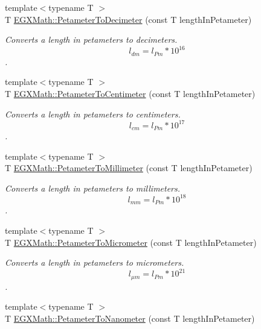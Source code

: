 \begin{DoxyCompactItemize}
{\footnotesize template$<$typename T $>$ }\\T \mbox{\hyperlink{group___e_g_x_math-_conversions-_length_conversions-_s_i-_petameter-_s_i_ga1e0359fb350c64cd3e1fc9293376de96}{E\+G\+X\+Math\+::\+Petameter\+To\+Decimeter}} (const T length\+In\+Petameter)
\begin{DoxyCompactList}\small\item\em Converts a length in petameters to decimeters. \[ l_{dm}=l_{Pm} * 10^{16} \]. \end{DoxyCompactList}\item 
{\footnotesize template$<$typename T $>$ }\\T \mbox{\hyperlink{group___e_g_x_math-_conversions-_length_conversions-_s_i-_petameter-_s_i_ga68b8b99b5e0f36fee33e5f0d0dea3f2b}{E\+G\+X\+Math\+::\+Petameter\+To\+Centimeter}} (const T length\+In\+Petameter)
\begin{DoxyCompactList}\small\item\em Converts a length in petameters to centimeters. \[ l_{cm}=l_{Pm} * 10^{17} \]. \end{DoxyCompactList}\item 
{\footnotesize template$<$typename T $>$ }\\T \mbox{\hyperlink{group___e_g_x_math-_conversions-_length_conversions-_s_i-_petameter-_s_i_ga932654bf571e2dd9aa912a34fbcfe49f}{E\+G\+X\+Math\+::\+Petameter\+To\+Millimeter}} (const T length\+In\+Petameter)
\begin{DoxyCompactList}\small\item\em Converts a length in petameters to millimeters. \[ l_{mm}=l_{Pm} * 10^{18} \]. \end{DoxyCompactList}\item 
{\footnotesize template$<$typename T $>$ }\\T \mbox{\hyperlink{group___e_g_x_math-_conversions-_length_conversions-_s_i-_petameter-_s_i_ga3cbe403b66dcb4d5abca922fc48a9a1c}{E\+G\+X\+Math\+::\+Petameter\+To\+Micrometer}} (const T length\+In\+Petameter)
\begin{DoxyCompactList}\small\item\em Converts a length in petameters to micrometers. \[ l_{\mu m}=l_{Pm} * 10^{21} \]. \end{DoxyCompactList}\item 
{\footnotesize template$<$typename T $>$ }\\T \mbox{\hyperlink{group___e_g_x_math-_conversions-_length_conversions-_s_i-_petameter-_s_i_ga34b9bf3c48321cabdc394ab86a2e7cd7}{E\+G\+X\+Math\+::\+Petameter\+To\+Nanometer}} (const T length\+In\+Petameter)

\end{DoxyCompactItemize}
